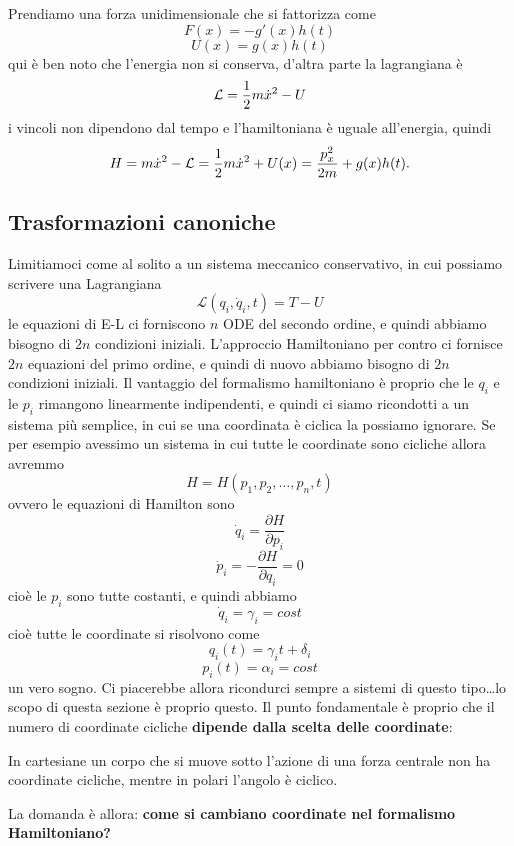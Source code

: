 \documentclass[11pt]{scrartcl}
\begin{document}
	\begin{example}
		Prendiamo una forza unidimensionale che si fattorizza come
		$$F(x)=-g'(x)h(t)$$
		$$U(x)=g(x)h(t)$$
		qui è ben noto che l'energia non si conserva, d'altra parte la lagrangiana è
		$$\mathcal{L}=\frac{1}{2} m\dot{x}^2-U$$
		i vincoli non dipendono dal tempo e l'hamiltoniana è uguale all'energia, quindi
		$$H=m\dot{x}^2-\mathcal{L}=\frac{1}{2} m\dot{x}^2+U(x)=\frac{p_x^2}{2m}+g(x)h(t).$$
	\end{example}
	
	\subsection{Trasformazioni canoniche}
	
	Limitiamoci come al solito a un sistema meccanico conservativo, in cui possiamo scrivere una Lagrangiana
	$$\mathcal{L}(q_i,\dot{q}_i,t)=T-U$$
	le equazioni di E-L ci forniscono $n$ ODE del secondo ordine, e quindi abbiamo bisogno di $2n$ condizioni iniziali. L'approccio Hamiltoniano per contro ci fornisce $2n$ equazioni del primo ordine, e quindi di nuovo abbiamo bisogno di $2n$ condizioni iniziali. Il vantaggio del formalismo hamiltoniano è proprio che le $q_i$ e le $p_i$ rimangono linearmente indipendenti, e quindi ci siamo ricondotti a un sistema più semplice, in cui se una coordinata è ciclica la possiamo ignorare. Se per esempio avessimo un sistema in cui tutte le coordinate sono cicliche allora avremmo
	$$H=H\left(p_1,p_2,\dots,p_n,t\right)$$
	ovvero le equazioni di Hamilton sono
	$$\dot{q}_i=\frac{\partial H}{\partial p_i}$$
	$$\dot{p}_i=-\frac{\partial H}{\partial q_i}=0$$
	cioè le $p_i$ sono tutte costanti, e quindi abbiamo
	$$\dot{q}_i=\gamma_i=cost$$
	cioè tutte le coordinate si risolvono come
	$$q_i(t)=\gamma_it+\delta_i$$
	$$p_i(t)=\alpha_i=cost$$
	un vero sogno. Ci piacerebbe allora ricondurci sempre a sistemi di questo tipo\dots lo scopo di questa sezione è proprio questo. Il punto fondamentale è proprio che il numero di coordinate cicliche \textbf{dipende dalla scelta delle coordinate}:
	\begin{example}
		In cartesiane un corpo che si muove sotto l'azione di una forza centrale non ha coordinate cicliche, mentre in polari l'angolo è ciclico.
	\end{example}
	La domanda è allora: \textbf{come si cambiano coordinate nel formalismo Hamiltoniano?}
\end{document}

